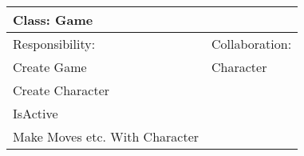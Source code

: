 \vspace{0.4cm}
\begin{tabular}{|p{7cm}|p{7cm}|} \hline
\multicolumn{2}{|l|}{Class:  Game} \\ \hline
Responsibility:  & Collaboration:  \\ \hline
 Create Game &  Character \\ 
 Create Character &   \\ 
 IsActive &   \\ 
 Make Moves etc. With Character &   \\ 
\hline
\end{tabular}
\vspace{0.8cm}
